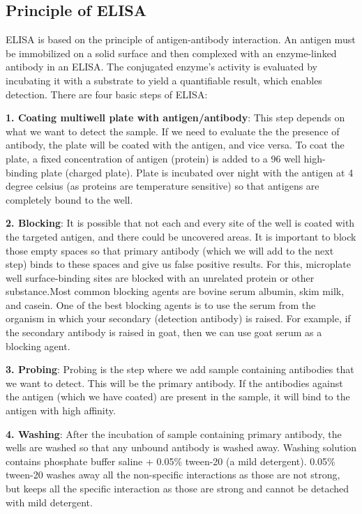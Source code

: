 \documentclass[
]{book}
\begin{document}
\hypertarget{principle-of-elisa}{%
\subsection{\texorpdfstring{\textbf{Principle of ELISA}}{Principle of ELISA}}\label{principle-of-elisa}}

ELISA is based on the principle of antigen-antibody interaction. An antigen must be immobilized on a solid surface and then complexed with an enzyme-linked antibody in an ELISA. The conjugated enzyme's activity is evaluated by incubating it with a substrate to yield a quantifiable result, which enables detection. There are four basic steps of ELISA:

\textbf{1. Coating multiwell plate with antigen/antibody}: This step depends on what we want to detect the sample. If we need to evaluate the the presence of antibody, the plate will be coated with the antigen, and vice versa. To coat the plate, a fixed concentration of antigen (protein) is added to a 96 well high-binding plate (charged plate). Plate is incubated over night with the antigen at 4 degree celsius (as proteins are temperature sensitive) so that antigens are completely bound to the well.

\textbf{2. Blocking}: It is possible that not each and every site of the well is coated with the targeted antigen, and there could be uncovered areas. It is important to block those empty spaces so that primary antibody (which we will add to the next step) binds to these spaces and give us false positive results. For this, microplate well surface-binding sites are blocked with an unrelated protein or other substance.Most common blocking agents are bovine serum albumin, skim milk, and casein. One of the best blocking agents is to use the serum from the organism in which your secondary (detection antibody) is raised. For example, if the secondary antibody is raised in goat, then we can use goat serum as a blocking agent.

\textbf{3. Probing}: Probing is the step where we add sample containing antibodies that we want to detect. This will be the primary antibody. If the antibodies against the antigen (which we have coated) are present in the sample, it will bind to the antigen with high affinity.

\textbf{4. Washing}: After the incubation of sample containing primary antibody, the wells are washed so that any unbound antibody is washed away. Washing solution contains phosphate buffer saline + 0.05\% tween-20 (a mild detergent). 0.05\% tween-20 washes away all the non-specific interactions as those are not strong, but keeps all the specific interaction as those are strong and cannot be detached with mild detergent.
\end{document}
